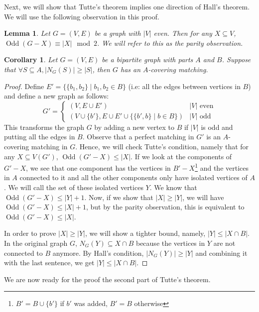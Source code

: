 \documentclass{tufte-handout}
\newtheorem{cor}[thm]{Corollary}
\newtheorem{lem}[thm]{Lemma}
\theoremstyle{definition}
\theoremstyle{remark}
\DeclareMathOperator{\odd}{Odd}
\begin{document}
Next, we will show that Tutte's theorem implies one direction of Hall's theorem. We will use the following observation in this proof.
\begin{lem}
	Let $G = (V,E)$ be a graph with $|V|$ even. Then for any $X \subseteq V$, $\odd(G-X) \equiv |X| \mod{2}$. We will refer to this as the parity observation.
\end{lem}
\begin{cor}
	Let $G = (V,E)$ be a bipartite graph with parts $A$ and $B$. Suppose that $\forall S \subseteq A, |N_G(S)| \geq |S|$, then $G$ has an $A$-covering matching.
\end{cor}
\begin{proof}
	Define $E' = \{\{b_1,b_2\} \mid b_1, b_2 \in B\}$ (i.e: all the edges between vertices in $B$) and define a new graph as follows:
	\[ G' = \begin{cases}
		(V, E \cup E') & |V| \text{ even}\\
		(V \cup \{b'\}, E \cup E' \cup \{\{b',b\} \mid b \in B\}) & |V| \text{ odd}
	\end{cases} \]
	This transforms the graph $G$ by adding a new vertex to $B$ if $|V|$ is odd and putting all the edges in $B$. Observe that a perfect matching in $G'$ is an $A$-covering matching in $G$. Hence, we will check Tutte's condition, namely that for any $X \subseteq V(G')$, $\odd(G'-X) \leq |X|$. If we look at the components of $G'-X$, we see that one component has the vertices in $B'-X$\footnote{$B' = B \cup \{b'\}$ if $b'$ was added, $B'=B$ otherwise} and the vertices in $A$ connected to it and all the other components only have isolated vertices of $A$. We will call the set of these isolated vertices $Y$. We know that $\odd(G'-X) \leq |Y| + 1$. Now, if we show that $|X| \geq |Y|$, we will have $\odd(G'-X) \leq |X| +1$, but by the parity observation, this is equivalent to $\odd(G'-X) \leq |X|$.
	
	In order to prove $|X| \geq |Y|$, we will show a tighter bound, namely, $|Y| \leq |X\cap B|$. In the original graph $G$, $N_G(Y) \subseteq X \cap B$ because the vertices in $Y$ are not connected to $B$ anymore. By Hall's condition, $|N_G(Y)| \geq |Y|$ and combining it with the last sentence, we get $|Y| \leq |X \cap B|$.
\end{proof}
We are now ready for the proof the second part of Tutte's theorem.
\end{document}

